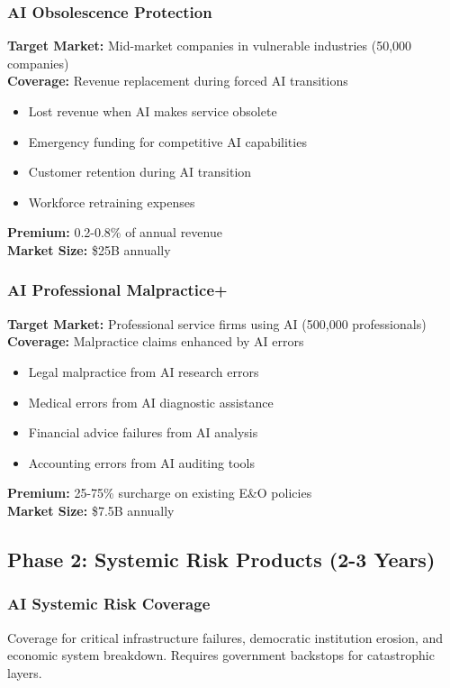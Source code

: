 \documentclass[11pt]{article}
\begin{document}
\subsubsection{AI Obsolescence Protection}
\textbf{Target Market:} Mid-market companies in vulnerable industries (50,000 companies)\\
\textbf{Coverage:} Revenue replacement during forced AI transitions
\begin{itemize}
   \item Lost revenue when AI makes service obsolete
   \item Emergency funding for competitive AI capabilities
   \item Customer retention during AI transition
   \item Workforce retraining expenses
\end{itemize}
\textbf{Premium:} 0.2-0.8\% of annual revenue\\
\textbf{Market Size:} \$25B annually

\subsubsection{AI Professional Malpractice+}
\textbf{Target Market:} Professional service firms using AI (500,000 professionals)\\
\textbf{Coverage:} Malpractice claims enhanced by AI errors
\begin{itemize}
   \item Legal malpractice from AI research errors
   \item Medical errors from AI diagnostic assistance
   \item Financial advice failures from AI analysis
   \item Accounting errors from AI auditing tools
\end{itemize}
\textbf{Premium:} 25-75\% surcharge on existing E\&O policies\\
\textbf{Market Size:} \$7.5B annually

\subsection{Phase 2: Systemic Risk Products (2-3 Years)}

\subsubsection{AI Systemic Risk Coverage}
Coverage for critical infrastructure failures, democratic institution erosion, and economic system breakdown. Requires government backstops for catastrophic layers.
\end{document}
